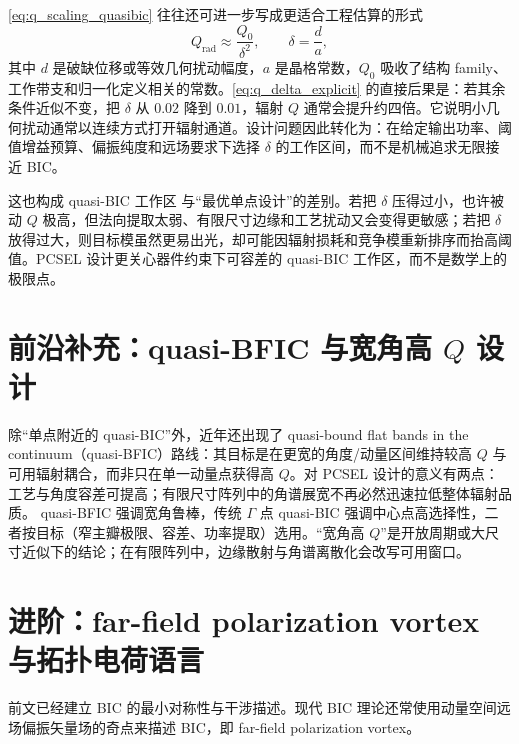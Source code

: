 \cref{eq:q_scaling_quasibic} 往往还可进一步写成更适合工程估算的形式
\begin{equation}
Q_{\mathrm{rad}} \approx \frac{Q_0}{\delta^2},
\qquad
\delta=\frac{d}{a},
\label{eq:q_delta_explicit}
\end{equation}
其中 $d$ 是破缺位移或等效几何扰动幅度，$a$ 是晶格常数，$Q_0$ 吸收了结构 family、工作带支和归一化定义相关的常数。\cref{eq:q_delta_explicit} 的直接后果是：若其余条件近似不变，把 $\delta$ 从 $0.02$ 降到 $0.01$，辐射 $Q$ 通常会提升约四倍\cite{koshelev2018quasibic}。它说明小几何扰动通常以连续方式打开辐射通道。设计问题因此转化为：在给定输出功率、阈值增益预算、偏振纯度和远场要求下选择 $\delta$ 的工作区间，而不是机械追求无限接近 BIC。

这也构成 quasi-BIC 工作区 与“最优单点设计”的差别。若把 $\delta$ 压得过小，也许被动 $Q$ 极高，但法向提取太弱、有限尺寸边缘和工艺扰动又会变得更敏感；若把 $\delta$ 放得过大，则目标模虽然更易出光，却可能因辐射损耗和竞争模重新排序而抬高阈值。PCSEL 设计更关心器件约束下可容差的 quasi-BIC 工作区，而不是数学上的极限点。

\section{前沿补充：quasi-BFIC 与宽角高 \texorpdfstring{$Q$}{Q} 设计}
除“单点附近的 quasi-BIC”外，近年还出现了 quasi-bound flat bands in the continuum（quasi-BFIC）路线\cite{qin2025quasibfic}：其目标是在更宽的角度/动量区间维持较高 $Q$ 与可用辐射耦合，而非只在单一动量点获得高 $Q$。对 PCSEL 设计的意义有两点：工艺与角度容差可提高；有限尺寸阵列中的角谱展宽不再必然迅速拉低整体辐射品质。
quasi-BFIC 强调宽角鲁棒，传统 $\Gamma$ 点 quasi-BIC 强调中心点高选择性，二者按目标（窄主瓣极限、容差、功率提取）选用\cite{hsu2016,koshelev2018quasibic}。“宽角高 $Q$”是开放周期或大尺寸近似下的结论；在有限阵列中，边缘散射与角谱离散化会改写可用窗口\cite{wang2025finitesizepcsel}。

\section{进阶：far-field polarization vortex 与拓扑电荷语言}
前文已经建立 BIC 的最小对称性与干涉描述。现代 BIC 理论还常使用动量空间远场偏振矢量场的奇点来描述 BIC，即 far-field polarization vortex。

